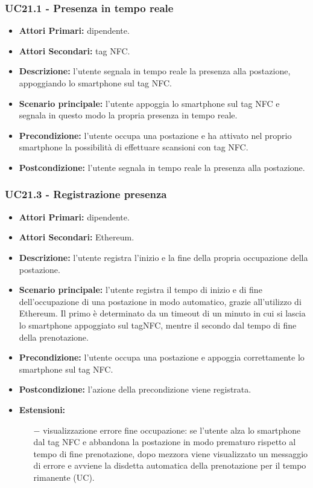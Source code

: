 \subsubsection{ UC21.1 - Presenza in tempo reale}
\begin{itemize}
	\item\textbf{Attori Primari:} dipendente.
	\item\textbf{Attori Secondari:} tag NFC.
	\item\textbf{Descrizione:} l’utente segnala in tempo reale la presenza alla postazione, appoggiando lo smartphone sul tag NFC.
	\item\textbf{Scenario principale:} l’utente appoggia lo smartphone sul tag NFC e segnala in questo modo la propria presenza in tempo reale.
	\item\textbf{Precondizione:} l’utente occupa una postazione e ha attivato nel proprio smartphone la possibilità di effettuare scansioni con tag NFC.
	\item\textbf{Postcondizione:} l’utente segnala in tempo reale la presenza alla postazione.
\end{itemize}


\subsubsection{ UC21.3 - Registrazione presenza}
\begin{itemize}
	\item\textbf{Attori Primari:} dipendente.
	\item\textbf{Attori Secondari:} Ethereum.
	\item\textbf{Descrizione:} l’utente registra l'inizio e la fine della propria occupazione della postazione.
	\item\textbf{Scenario principale:} l'utente registra il tempo di inizio e di fine dell'occupazione di una postazione in modo automatico, grazie all'utilizzo di Ethereum. Il primo è determinato da un timeout di un minuto in cui si lascia lo smartphone appoggiato sul tagNFC, mentre il secondo dal tempo di fine della prenotazione.
	\item\textbf{Precondizione:} l’utente occupa una postazione e appoggia correttamente lo smartphone sul tag NFC. 
	\item\textbf{Postcondizione:} l'azione della precondizione viene registrata.
	\item\textbf{Estensioni:} 
	\begin{itemize}
		\item[$-$] visualizzazione errore fine occupazione: se l'utente alza lo smartphone dal tag NFC e abbandona la postazione in modo prematuro rispetto al tempo di fine prenotazione, dopo mezzora viene visualizzato un messaggio di errore e avviene la disdetta automatica della prenotazione per il tempo rimanente (UC).
	\end{itemize}
\end{itemize}

